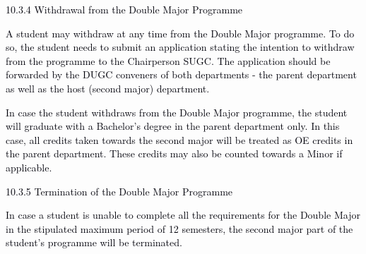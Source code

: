 \documentclass[12pt]{article}
\begin{document}
\vspace{\baselineskip}
{\fontsize{10pt}{12.0pt}\selectfont \textcolor[HTML]{00000A}{10.3.4 Withdrawal from the Double Major Programme}\par}\par


\vspace{\baselineskip}
\begin{adjustwidth}{0.25in}{0.0in}
\begin{justify}
{\fontsize{10pt}{12.0pt}\selectfont \textcolor[HTML]{00000A}{A student may withdraw at any time from the Double Major programme. To do so, the student needs to submit an application stating the intention to withdraw from the programme to the Chairperson SUGC. The application should be forwarded by the DUGC conveners of both departments - the parent department as well as the host (second major) department.}\par}
\end{justify}\par

\end{adjustwidth}


\vspace{\baselineskip}
\begin{adjustwidth}{0.25in}{0.0in}
\begin{justify}
{\fontsize{10pt}{12.0pt}\selectfont \textcolor[HTML]{00000A}{In case the student withdraws from the Double Major programme, the student will graduate with a Bachelor's degree in the parent department only. In this case, all credits taken towards the second major will be treated as OE credits in the parent department. These credits may also be counted towards a Minor if applicable.}\par}
\end{justify}\par

\end{adjustwidth}


\vspace{\baselineskip}

\vspace{\baselineskip}
{\fontsize{10pt}{12.0pt}\selectfont \textcolor[HTML]{00000A}{10.3.5 Termination of the Double Major Programme}\par}\par


\vspace{\baselineskip}
\begin{adjustwidth}{0.25in}{0.01in}
\begin{justify}
{\fontsize{10pt}{12.0pt}\selectfont \textcolor[HTML]{00000A}{In case a student is unable to complete all the requirements for the Double Major in the stipulated maximum period of 12 semesters, the second major part of the student’s programme will be terminated.}\par}
\end{justify}\par

\end{adjustwidth}
\end{document}
